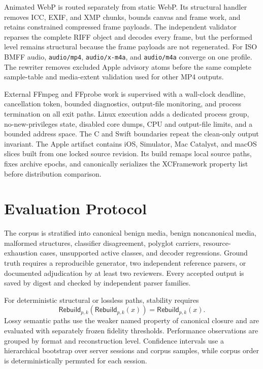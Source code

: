 \documentclass[preprint,12pt]{elsarticle}
\newcommand{\Rebuild}{\mathsf{Rebuild}}
\begin{document}
Animated WebP is routed separately from static WebP. Its structural handler
removes ICC, EXIF, and XMP chunks, bounds canvas and frame work, and retains
constrained compressed frame payloads. The independent validator reparses the
complete RIFF object and decodes every frame, but the performed level remains
structural because the frame payloads are not regenerated. For ISO BMFF audio,
\texttt{audio/mp4}, \texttt{audio/x-m4a}, and \texttt{audio/m4a} converge on
one profile. The rewriter removes excluded Apple advisory atoms before the
same complete sample-table and media-extent validation used for other MP4
outputs.

External FFmpeg and FFprobe work is supervised with a wall-clock deadline,
cancellation token, bounded diagnostics, output-file monitoring, and process
termination on all exit paths. Linux execution adds a dedicated process group,
no-new-privileges state, disabled core dumps, CPU and output-file limits, and a
bounded address space. The C and Swift boundaries repeat the clean-only output
invariant. The Apple artifact contains iOS, Simulator, Mac Catalyst, and macOS
slices built from one locked source revision. Its build remaps local source
paths, fixes archive epochs, and canonically serializes the XCFramework property
list before distribution comparison.

\section{Evaluation Protocol}\label{sec:evaluation}

The corpus is stratified into canonical benign media, benign noncanonical
media, malformed structures, classifier disagreement, polyglot carriers,
resource-exhaustion cases, unsupported active classes, and decoder regressions.
Ground truth requires a reproducible generator, two independent reference
parsers, or documented adjudication by at least two reviewers. Every accepted
output is saved by digest and checked by independent parser families.

For deterministic structural or lossless paths, stability requires
\begin{equation}
  \Rebuild_{p,k}(\Rebuild_{p,k}(x))=\Rebuild_{p,k}(x).
  \label{eq:idempotence}
\end{equation}
Lossy semantic paths use the weaker named property of canonical closure and are
evaluated with separately frozen fidelity thresholds. Performance observations
are grouped by format and reconstruction level. Confidence intervals use a
hierarchical bootstrap over server sessions and corpus samples, while corpus
order is deterministically permuted for each session.
\end{document}
